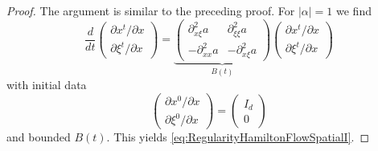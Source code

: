 \documentclass{amsart}
\theoremstyle{definition}
\begin{document}
\begin{proof}
The argument is similar to the preceding proof. For $|\alpha| = 1$ we find
\begin{equation}
\label{eq:VariationalEquationII}
\frac{d}{dt} \begin{pmatrix}
\partial x^t / \partial x \\ \partial \xi^t / \partial x
\end{pmatrix}
= \underbrace{\begin{pmatrix}
\partial_{x \xi}^2 a & \partial^2_{\xi \xi} a \\
- \partial_{x x}^2 a  & - \partial^2_{x \xi} a
\end{pmatrix}}_{B(t)}
 \begin{pmatrix}
\partial x^t / \partial x \\
\partial \xi^t / \partial x
\end{pmatrix}
\end{equation}
with initial data
\begin{equation*}
\begin{pmatrix}
\partial x^0 / \partial x \\
\partial \xi^0 / \partial x
\end{pmatrix}
=
\begin{pmatrix}
I_d \\ 0
\end{pmatrix}
\end{equation*}
and bounded $B(t)$. This yields \eqref{eq:RegularityHamiltonFlowSpatialI}. 


\end{proof}
\end{document}
